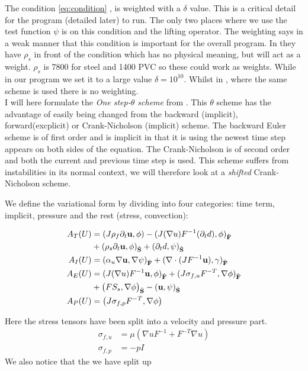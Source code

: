 The condition \eqref{eq:condition} , is weighted with a $\delta$ value. This is a critical detail for the program (detailed later) to run. The only two places where we use the test function $\psi$ is on this condition and the lifting operator. The weighting says in a weak manner that this condition is important for the overall program. In \cite{Wick} they have $\rho_s$ in front of the condition which has no physical meaning, but will act as a weight. $\rho_s$ is 7800 for steel and 1400 PVC \cite{Hron2006a} so these could work as weights. While in our program we set it to a large value $\delta = 10^{10}$. Whilst in \cite{Wick2011a}, where the same scheme is used there is no weighting. 
\\
I will here formulate the \textit{One step-$\theta$ scheme} from \cite{Wick2011}. This $\theta$ scheme has the advantage of easily being changed from the backward (implicit), forward(excplicit) or Crank-Nicholson (implicit) scheme. The backward Euler scheme is of first order and is implicit in that it is using the newest time step appears on both sides of the equation. The Crank-Nicholson is of second order and both the current and previous time step is used. This scheme suffers from instabilities in its normal context, we will therefore look at a \textit{shifted} Crank-Nicholson scheme. 

We define the variational form by dividing into four categories: time term, implicit, pressure and the rest (stress, convection):

\begin{align}
A_T(U) &= (J \rho_f \partial_t \bold{u} , \phi ) - (J (\nabla u)F^{-1}(\partial_t d) , \phi )_{\mathcal{\hat{F}}} \\
	    & + (\rho_s \partial_t \bold{u} , \phi)_{\mathcal{\hat{S}}} + (\partial_t d , \psi)_{\mathcal{\hat{S}}}  \\
A_I(U) &= ( \alpha_u \nabla \bold{u}, \nabla \psi)_{\mathcal{\hat{F}}} + (\nabla \cdot (J F^{-1} \bold{u}), \gamma)_{\mathcal{\hat{F}}} \\
A_E(U) &= (J (\nabla u)F^{-1} \bold{u} , \phi )_{\mathcal{\hat{F}}} + ( J \sigma_{f,u} F^{-T} , \nabla \phi )_{\mathcal{\hat{F}}} \\
	    & + \big(F S_s, \nabla \phi \big)_{\mathcal{\hat{S}}} - ( \bold{u} , \psi )_{\mathcal{\hat{S}}} \\
A_P(U) &= \big( J \sigma_{f,p} F^{-T}, \nabla \phi  \big)  	 		
\end{align}

Here the stress tensors have been split into a velocity and pressure part. 
\begin{align}
\sigma_{f,u} &= \mu ( \nabla u F^{-1} + F^{-T} \nabla u) \\
\sigma_{f,p} &= -p I
\end{align}
We also notice that the we have split up 

